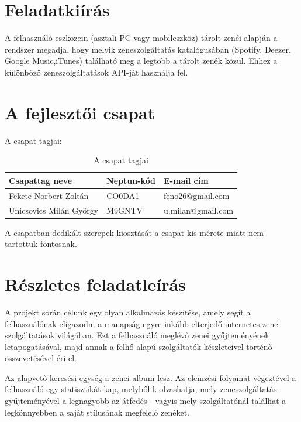 \section{Feladatkiírás}
\label{sec:feladatkiiras}

A felhasználó eszközein (asztali PC vagy mobileszköz) tárolt zenéi alapján a rendszer megadja, hogy melyik zeneszolgáltatás katalógusában (Spotify, Deezer, Google Music,iTunes) található meg a legtöbb a tárolt zenék közül. Ehhez a különböző zeneszolgáltatások API-ját használja fel.


\section{A fejlesztői csapat}
\label{sec:afejlesztoicsapat}

A csapat tagjai:

\begin{table}[htb]
\begin{center}
\begin{tabular}{|l|l|l|}
\hline
\textbf{Csapattag neve} & \textbf{Neptun-kód} & \textbf{E-mail cím} \\ \hline
Fekete Norbert Zoltán & CO0DA1 & feno26@gmail.com \\ \hline
Unicsovics Milán György & M9GNTV & u.milan@gmail.com \\ \hline
\end{tabular}
\end{center}
\label{tab:acsapattagjai}
\caption{A csapat tagjai}
\end{table}

A csapatban dedikált szerepek kiosztását a csapat kis mérete miatt nem tartottuk fontosnak.


\section{Részletes feladatleírás}
\label{sec:reszletesfeladatkiiras}

A projekt során célunk egy olyan alkalmazás készítése, amely segít a felhasználónak eligazodni a manapság egyre inkább elterjedő internetes zenei szolgáltatások világában. Ezt a felhasználó meglévő zenei gyűjteményének letapogatásával, majd annak a felhő alapú szolgáltatók készleteivel történő összevetésével éri el.

Az alapvető keresési egység a zenei album lesz. Az elemzési folyamat végeztével a felhasználó egy statisztikát kap, melyből kiolvashatja, mely zeneszolgáltatás gyűjteményével a legnagyobb az átfedés - vagyis mely szolgáltatónál találhat a legkönnyebben a saját stílusának megfelelő zenéket.

